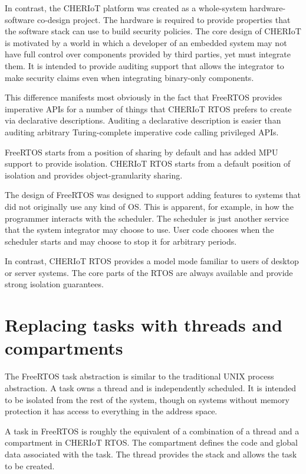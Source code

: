 In contrast, the CHERIoT platform was created as a whole-system hardware-software co-design project.
The hardware is required to provide properties that the software stack can use to build security policies.
The core design of CHERIoT is motivated by a world in which a developer of an embedded system may not have full control over components provided by third parties, yet must integrate them.
It is intended to provide auditing support that allows the integrator to make security claims even when integrating binary-only components.

This difference manifests most obviously in the fact that FreeRTOS provides imperative APIs for a number of things that CHERIoT RTOS prefers to create via declarative descriptions.
Auditing a declarative description is easier than auditing arbitrary Turing-complete imperative code calling privileged APIs.

FreeRTOS starts from a position of sharing by default and has added MPU support to provide isolation.
CHERIoT RTOS starts from a default position of isolation and provides object-granularity sharing.

The design of FreeRTOS was designed to support adding features to systems that did not originally use any kind of OS.
This is apparent, for example, in how the programmer interacts with the scheduler.
The scheduler is just another service that the system integrator may choose to use.
User code chooses when the scheduler starts and may choose to stop it for arbitrary periods.

In contrast, CHERIoT RTOS provides a model mode familiar to users of desktop or server systems.
The core parts of the RTOS are always available and provide strong isolation guarantees.

\section{Replacing tasks with threads and compartments}

The FreeRTOS task abstraction is similar to the traditional UNIX process abstraction.
A task owns a thread and is independently scheduled.
It is intended to be isolated from the rest of the system, though on systems without memory protection it has access to everything in the address space.

A task in FreeRTOS is roughly the equivalent of a combination of a thread and a compartment in CHERIoT RTOS.
The compartment defines the code and global data associated with the task.
The thread provides the stack and allows the task to be created.

